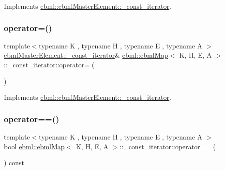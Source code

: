 Implements \mbox{\hyperlink{classebml_1_1ebmlMasterElement_1_1__const__iterator_a439f540325443a3c3a3acdcd8df81553}{ebml\+::ebml\+Master\+Element\+::\+\_\+const\+\_\+iterator}}.

\mbox{\label{classebml_1_1ebmlMap_1_1__const__iterator_a641afb65930e85882c6397d2f0930604}} 
\subsubsection{\texorpdfstring{operator=()}{operator=()}}
{\footnotesize\ttfamily template$<$typename K , typename H , typename E , typename A $>$ \\
\mbox{\hyperlink{classebml_1_1ebmlMasterElement_1_1__const__iterator}{ebml\+Master\+Element\+::\+\_\+const\+\_\+iterator}}\& \mbox{\hyperlink{classebml_1_1ebmlMap}{ebml\+::ebml\+Map}}$<$ K, H, E, A $>$\+::\+\_\+const\+\_\+iterator\+::operator= (\begin{DoxyParamCaption}\item[{const \mbox{\hyperlink{classebml_1_1ebmlMasterElement_1_1__const__iterator}{ebml\+Master\+Element\+::\+\_\+const\+\_\+iterator}} \&}]{ }\end{DoxyParamCaption})\hspace{0.3cm}{\ttfamily [virtual]}}



Implements \mbox{\hyperlink{classebml_1_1ebmlMasterElement_1_1__const__iterator_a102cf8b36c0d8184680ef15594bb59fb}{ebml\+::ebml\+Master\+Element\+::\+\_\+const\+\_\+iterator}}.

\mbox{\label{classebml_1_1ebmlMap_1_1__const__iterator_aa0b4af1c5b7d8bdb26def33c2a329371}} 
\subsubsection{\texorpdfstring{operator==()}{operator==()}}
{\footnotesize\ttfamily template$<$typename K , typename H , typename E , typename A $>$ \\
bool \mbox{\hyperlink{classebml_1_1ebmlMap}{ebml\+::ebml\+Map}}$<$ K, H, E, A $>$\+::\+\_\+const\+\_\+iterator\+::operator== (\begin{DoxyParamCaption}\item[{const \mbox{\hyperlink{classebml_1_1ebmlMasterElement_1_1__const__iterator}{ebml\+Master\+Element\+::\+\_\+const\+\_\+iterator}} \&}]{ }\end{DoxyParamCaption}) const\hspace{0.3cm}{\ttfamily [virtual]}}



